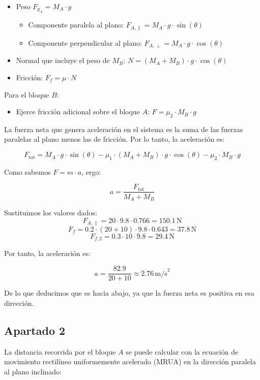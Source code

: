 \documentclass[a4paper,12pt]{article} %
\begin{document}
\begin{itemize}
    \item Peso \( F_{g_A} = M_A \cdot g \)
    \begin{itemize}
        \item Componente paralela al plano: \( F_{A,\parallel} = M_A \cdot g \cdot \sin(\theta) \)
        \item Componente perpendicular al plano: \( F_{A,\perp} = M_A \cdot g \cdot \cos(\theta) \)
    \end{itemize}
    \item Normal que incluye el peso de \( M_B \): \( N = (M_A + M_B) \cdot g \cdot \cos(\theta) \)
    \item Fricción: \( F_f = \mu \cdot N \)
\end{itemize}

Para el bloque \( B \):
\begin{itemize}
    \item Ejerce fricción adicional sobre el bloque \( A \): \( F = \mu_2 \cdot M_B \cdot g \)
\end{itemize}

La fuerza neta que genera aceleración en el sistema es la suma de las fuerzas paralelas al plano menos las de fricción. Por lo tanto, la aceleración es:

\[
F_{\text{tot}} = M_A \cdot g \cdot \sin(\theta) - \mu_1 \cdot (M_A + M_B) \cdot g \cdot \cos(\theta) - \mu_2 \cdot M_B \cdot g
\]

Como sabemos \( F = m \cdot a \), ergo:

\[
a = \frac{F_{\text{tot}}}{M_A + M_B}
\]

Sustituimos los valores dados:
\[
F_{A,\parallel} = 20 \cdot 9.8 \cdot 0.766 = 150.1 \, \text{N}
\]
\[
F_f = 0.2 \cdot (20 + 10) \cdot 9.8 \cdot 0.643 = 37.8 \, \text{N}
\]
\[
F_{f,2} = 0.3 \cdot 10 \cdot 9.8 = 29.4 \, \text{N}
\]

Por tanto, la aceleración es:

\[
a = \frac{82.9}{20 + 10} \approx 2.76 \, \text{m/s}^2
\]

De lo que deducimos que es hacia abajo, ya que la fuerza neta es positiva en esa dirección.

\subsection*{Apartado 2}
La distancia recorrida por el bloque \( A \) se puede calcular con la ecuación de movimiento rectilíneo uniformemente acelerado (MRUA) en la dirección paralela al plano inclinado:
\end{document}
